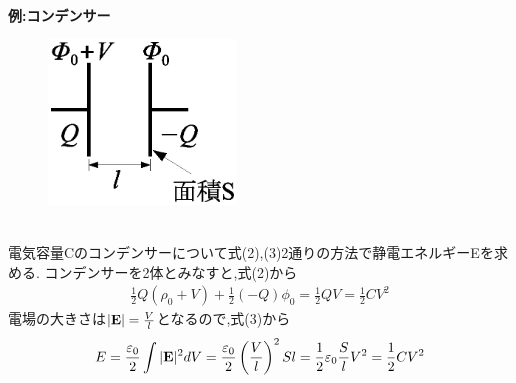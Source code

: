 \documentclass{jsarticle}
\begin{document}
\\
{\bf 例:コンデンサー} \\
\begin{figure}[h]
 \begin{center}
  \includegraphics[width=50mm]{6.1.eps}
 \end{center}
 \caption{}
 \label{fig:one}
\end{figure}
\\
電気容量Cのコンデンサーについて式(2),(3)2通りの方法で静電エネルギーEを求める.
コンデンサーを2体とみなすと,式(2)から
\begin{eqnarray*}
\frac{1}{2}Q(\rho_0 + V) + \frac{1}{2}(-Q)\phi_0 = \frac{1}{2}QV = \frac{1}{2}CV^2
\end{eqnarray*}
電場の大きさは$|{\bf E}|=\frac{V}{l}$となるので,式(3)から
\begin{eqnarray*}
E = \frac{\varepsilon_0}{2} \int |{\bf E}|^2 dV 
= \frac{\varepsilon_0}{2} \left( \frac{V}{l} \right)^2 Sl = \frac{1}{2}\varepsilon_0 \frac{S}{l}V^2 = \frac{1}{2}CV^2
\end{eqnarray*}
\end{document}
